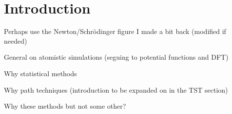 \section{Introduction}
\label{sec:methods-introduction}

\bit
\item Perhaps use the Newton/Schr\"odinger figure I made a bit back (modified if needed)
\item General on atomistic simulations (seguing to potential functions and DFT)
\item Why statistical methods
\item Why path techniques (introduction to be expanded on in the TST section)
\item Why these methods but not some other?
\eit

\placeholder
